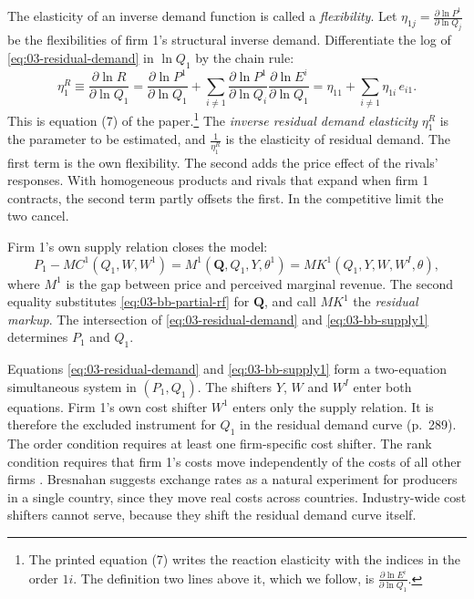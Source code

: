 The elasticity of an inverse demand function is called a \emph{flexibility}. Let $\eta_{1j} = \frac{\partial
\ln P^1}{\partial \ln Q_j}$ be the flexibilities of firm 1's structural inverse demand. Differentiate the log
of \eqref{eq:03-residual-demand} in $\ln Q_1$ by the chain rule:
\begin{equation}\label{eq:03-bb-elasticity}
  \eta^R_1 \equiv \frac{\partial \ln R}{\partial \ln Q_1}
  = \frac{\partial \ln P^1}{\partial \ln Q_1} + \sum_{i \neq 1}\frac{\partial \ln P^1}{\partial \ln Q_i}
    \frac{\partial \ln E^i}{\partial \ln Q_1}
  = \eta_{11} + \sum_{i \neq 1} \eta_{1i}\, e_{i1}.
\end{equation}
This is equation (7) of the paper.\footnote{The printed equation (7) writes the reaction elasticity with the
indices in the order $1i$. The definition two lines above it, which we follow, is $\frac{\partial \ln
E^i}{\partial \ln Q_1}$.} The \emph{inverse residual demand elasticity} $\eta^R_1$ is the parameter to be
estimated, and $\frac{1}{\eta^R_1}$ is the elasticity of residual demand. The first term is the own
flexibility. The second adds the price effect of the rivals' responses. With homogeneous products and
rivals that expand when firm 1 contracts, the second term partly offsets the first. In the competitive limit
the two cancel.

Firm 1's own supply relation closes the model:
\begin{equation}\label{eq:03-bb-supply1}
  P_1 - MC^1(Q_1, W, W^1) = M^1(\mathbf{Q}, Q_1, Y, \theta^1) = MK^1(Q_1, Y, W, W^I, \theta),
\end{equation}
where $M^1$ is the gap between price and perceived marginal revenue. The second equality substitutes
\eqref{eq:03-bb-partial-rf} for $\mathbf{Q}$, and \citet{BakerBresnahan1988} call $MK^1$ the \emph{residual
markup}. The intersection of \eqref{eq:03-residual-demand} and \eqref{eq:03-bb-supply1} determines $P_1$
and $Q_1$.

 Equations \eqref{eq:03-residual-demand} and \eqref{eq:03-bb-supply1} form a
two-equation simultaneous system in $(P_1, Q_1)$. The shifters $Y$, $W$ and $W^I$ enter both equations.
Firm 1's own cost shifter $W^1$ enters only the supply relation. It is therefore the excluded instrument for
$Q_1$ in the residual demand curve (p.~289). The order condition requires at least one firm-specific cost
shifter. The rank condition requires that firm 1's costs move independently of the costs of all other firms
\citep[n.~43]{Bresnahan1989}. Bresnahan suggests exchange rates as a natural experiment for producers in a
single country, since they move real costs across countries. Industry-wide cost shifters cannot serve,
because they shift the residual demand curve itself.

